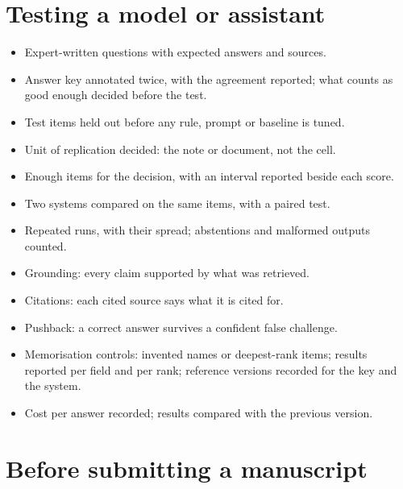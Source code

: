 \section{Testing a model or assistant}

\begin{itemize}[label=$\square$]
  \item Expert-written questions with expected answers and sources.
  \item Answer key annotated twice, with the agreement reported; what counts as
    good enough decided before the test.
  \item Test items held out before any rule, prompt or baseline is tuned.
  \item Unit of replication decided: the note or document, not the cell.
  \item Enough items for the decision, with an interval reported beside each
    score.
  \item Two systems compared on the same items, with a paired test.
  \item Repeated runs, with their spread; abstentions and malformed outputs
    counted.
  \item Grounding: every claim supported by what was retrieved.
  \item Citations: each cited source says what it is cited for.
  \item Pushback: a correct answer survives a confident false challenge.
  \item Memorisation controls: invented names or deepest-rank items; results
    reported per field and per rank; reference versions recorded for the key
    and the system.
  \item Cost per answer recorded; results compared with the previous version.
\end{itemize}

\section{Before submitting a manuscript}

